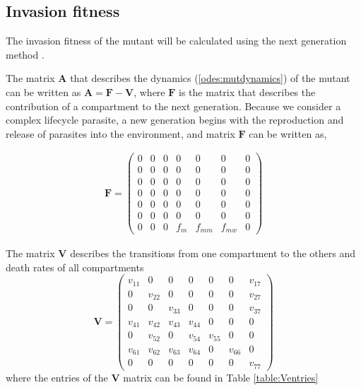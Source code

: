 \documentclass{article}
\begin{document}
\subsection{Invasion fitness}
The invasion fitness of the mutant will be calculated using the next generation method \citep{hurford:JRSI:2010}.

The matrix $\mathbf{A}$ that describes the dynamics (\ref{odes:mutdynamics}) of the mutant can be written as $\mathbf{A} = \mathbf{F} - \mathbf{V}$, where $\mathbf{F}$ is the matrix that describes the contribution of a compartment to the next generation. 
Because we consider a complex lifecycle parasite, a new generation begins with the reproduction and release of parasites into the environment, and matrix $\mathbf{F}$ can be written as,

\begin{align*}
    \mathbf{F} = 
    \begin{pmatrix}
   	 0 & 0 & 0 & 0   & 0 	  & 0 	   & 0 \\
	 0 & 0 & 0 & 0   & 0 	  & 0 	   & 0 \\
	 0 & 0 & 0 & 0   & 0 	  & 0 	   & 0 \\
	 0 & 0 & 0 & 0   & 0      & 0	   & 0 \\
	 0 & 0 & 0 & 0   & 0      & 0      & 0 \\ 
	 0 & 0 & 0 & 0   & 0      & 0      & 0 \\
	 0 & 0 & 0 & f_m & f_{mm} & f_{mw} & 0
    \end{pmatrix}
\end{align*}

The matrix $\mathbf{V}$ describes the transitions from one compartment to the others and death rates of all compartments
\[
    \mathbf{V} = 
    \begin{pmatrix*}
     v_{11}  & 0 & 0 & 0 & 0 & 0 & v_{17} \\
     0  &  v_{22} & 0 & 0 & 0 & 0 & v_{27} \\ 
     0  &  0  &  v_{33} &  0  &  0  &  0  & v_{37} \\
    v_{41}  &  v_{42} & v_{43} &  v_{44} &  0 & 0 & 0 \\
     0 & v_{52}  &  0  & v_{54} &  v_{55} & 0 & 0  \\
     v_{61} & v_{62} & v_{63} & v_{64}  &  0  & v_{66} & 0 \\
     0  &  0  &  0  &  0  &  0  &  0  &  v_{77}
    \end{pmatrix*}
\]
where the entries of the $\mathbf{V}$ matrix can be found in Table \ref{table:Ventries}
\end{document}
